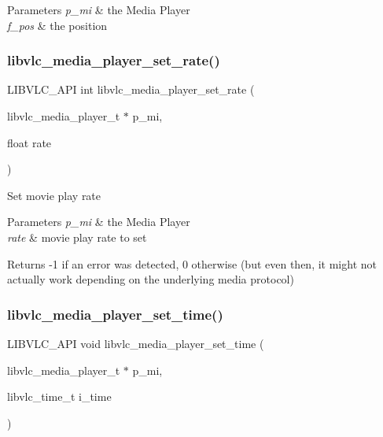 \begin{DoxyParams}{Parameters}
{\em p\+\_\+mi} & the Media Player \\
\hline
{\em f\+\_\+pos} & the position \\
\hline
\end{DoxyParams}
\mbox{\label{group__libvlc__media__player_gaa81be3afb20eddedf7ae56e98d4b1e06}} 
\subsubsection{\texorpdfstring{libvlc\+\_\+media\+\_\+player\+\_\+set\+\_\+rate()}{libvlc\_media\_player\_set\_rate()}}
{\footnotesize\ttfamily L\+I\+B\+V\+L\+C\+\_\+\+A\+PI int libvlc\+\_\+media\+\_\+player\+\_\+set\+\_\+rate (\begin{DoxyParamCaption}\item[{libvlc\+\_\+media\+\_\+player\+\_\+t $\ast$}]{p\+\_\+mi,  }\item[{float}]{rate }\end{DoxyParamCaption})}

Set movie play rate


\begin{DoxyParams}{Parameters}
{\em p\+\_\+mi} & the Media Player \\
\hline
{\em rate} & movie play rate to set \\
\hline
\end{DoxyParams}
\begin{DoxyReturn}{Returns}
-\/1 if an error was detected, 0 otherwise (but even then, it might not actually work depending on the underlying media protocol) 
\end{DoxyReturn}
\mbox{\label{group__libvlc__media__player_ga2f3347645100660ffae553387171e398}} 
\subsubsection{\texorpdfstring{libvlc\+\_\+media\+\_\+player\+\_\+set\+\_\+time()}{libvlc\_media\_player\_set\_time()}}
{\footnotesize\ttfamily L\+I\+B\+V\+L\+C\+\_\+\+A\+PI void libvlc\+\_\+media\+\_\+player\+\_\+set\+\_\+time (\begin{DoxyParamCaption}\item[{libvlc\+\_\+media\+\_\+player\+\_\+t $\ast$}]{p\+\_\+mi,  }\item[{libvlc\+\_\+time\+\_\+t}]{i\+\_\+time }\end{DoxyParamCaption})}

